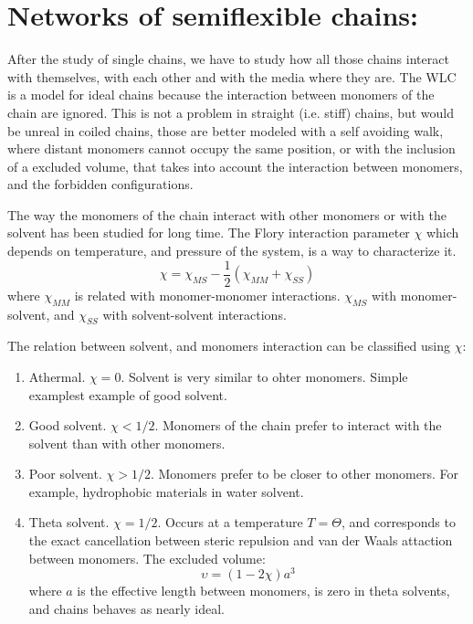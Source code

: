 \section{Networks of semiflexible chains:}
After the study of single chains, we have to study how all those chains interact
with themselves, with each other and with the media where they are.
The WLC is a model for ideal chains because the interaction between
monomers of the chain are ignored. This is not a problem in straight
(i.e. stiff) chains, but would be unreal in coiled chains, those are better
modeled with a self avoiding walk, where distant monomers cannot occupy the
same position, or with the inclusion of a excluded volume, that takes into
account the interaction between monomers, and the forbidden configurations.

The way the monomers of the chain interact with other monomers or with the
solvent has been studied for long time. The Flory interaction parameter $\chi$
which depends on temperature, and pressure of the system, is a way to
characterize it.
\begin{equation}\label{FloryInteraction}
\chi=\chi_{MS} - \frac{1}{2}(\chi_{MM} + \chi_{SS})
\end{equation}
where  $\chi_{MM}$ is related with monomer-monomer interactions. $\chi_{MS}$
with monomer-solvent, and $\chi_{SS}$ with solvent-solvent
interactions.

The relation between solvent, and monomers interaction can be classified using
$\chi$:
\begin{enumerate}
  \item Athermal. $\chi=0$. Solvent is very similar to ohter monomers. Simple
  examplest example of good solvent.
  \item Good solvent. $\chi<1/2$. Monomers of the chain prefer to interact with
  the solvent than with other monomers.
  \item Poor solvent. $\chi>1/2$. Monomers prefer to be closer to other
  monomers. For example, hydrophobic materials in water solvent.
  \item Theta solvent. $\chi=1/2$. Occurs at a temperature $T=\Theta$, and
  corresponds to the exact cancellation between steric repulsion and van der
  Waals attaction between monomers. The excluded volume:
  \begin{equation}\label{excludedvolume}
  \upsilon=(1-2\chi)a^3
  \end{equation}
  where $a$ is the effective length between monomers, is zero in theta solvents,
  and chains behaves as nearly ideal.\citep{gennes_scaling_1979}
\end{enumerate}

